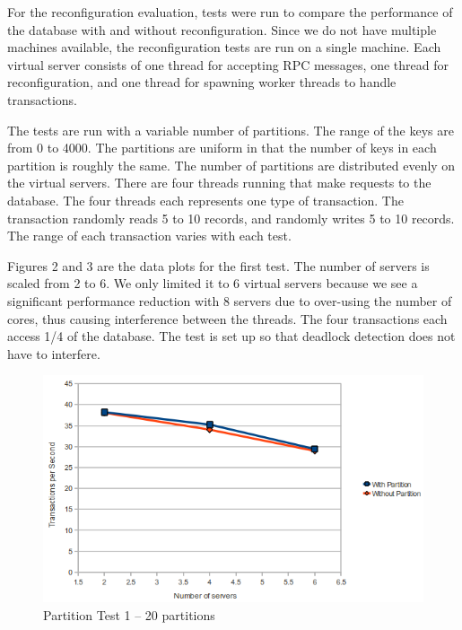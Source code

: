 \documentclass[a4paper, 10pt, notitlepage]{article}
\begin{document}
For the reconfiguration evaluation, tests were run to compare the performance of the database with and without reconfiguration.
Since we do not have multiple machines available, the reconfiguration tests are run on a single machine. Each virtual server
consists of one thread for accepting RPC messages, one thread for reconfiguration, and one thread for spawning worker
threads to handle transactions.

The tests are run with a variable number of partitions. The range of the keys are from 0 to 4000. The partitions are uniform in that the number
of keys in each partition is roughly the same. The number of partitions are distributed evenly on the virtual servers.
There are four threads running that make requests to the database. The four threads each
represents one type of transaction. The transaction randomly reads 5 to 10 records, and randomly writes 5 to 10 records.
The range of each transaction varies with each test.

Figures 2 and 3 are the data plots for the first test. The number of servers is scaled from 2 to 6. We only
limited it to 6 virtual servers because we see a significant performance reduction with 8 servers due to over-using the number
of cores, thus causing interference between the threads. The four transactions each access 1/4 of the database. The test is 
set up so that deadlock detection does not have to interfere. 

\begin{figure}[h!]

  \centering
    \includegraphics[scale=0.7]{peval1.png}
  \caption{Partition Test 1 -- 20 partitions}
\end{figure}
\end{document}
